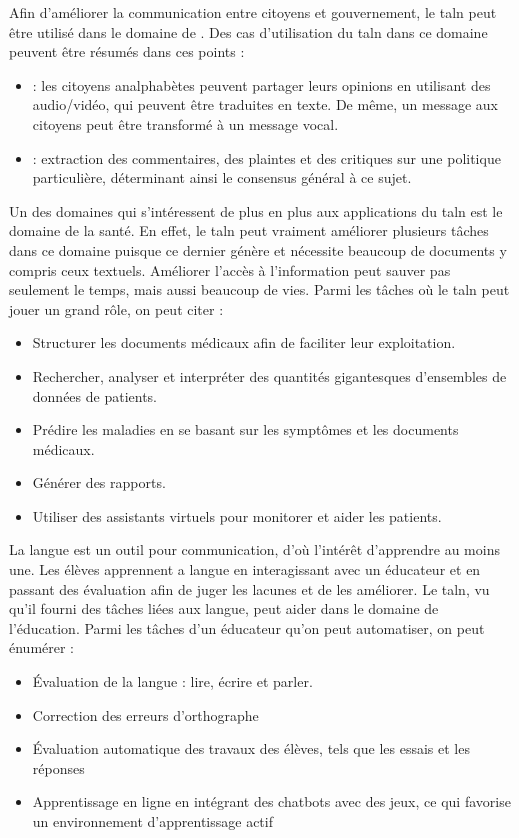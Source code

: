 \documentclass{KodeBook}
\begin{document}
Afin d'améliorer la communication entre citoyens et gouvernement, le \ac{taln} peut être utilisé dans le domaine de .
Des cas d'utilisation du \ac{taln} dans ce domaine peuvent être résumés dans ces points :
\begin{itemize}
	\item {} : les citoyens analphabètes peuvent partager leurs opinions en utilisant des audio/vidéo, qui peuvent être traduites en texte. De même, un message aux citoyens peut être transformé à un message vocal.
	\item {} : extraction des commentaires, des plaintes et des critiques sur une politique particulière, déterminant ainsi le consensus général à ce sujet.
\end{itemize}

Un des domaines qui s'intéressent de plus en plus aux applications du \ac{taln} est le domaine de la santé.
En effet, le \ac{taln} peut vraiment améliorer plusieurs tâches dans ce domaine puisque ce dernier génère et nécessite beaucoup de documents y compris ceux textuels.
Améliorer l'accès à l'information peut sauver pas seulement le temps, mais aussi beaucoup de vies.
Parmi les tâches où le \ac{taln} peut jouer un grand rôle, on peut citer :
\begin{itemize}
	\item Structurer les documents médicaux afin de faciliter leur exploitation.
	\item Rechercher, analyser et interpréter des quantités gigantesques d'ensembles de données de patients.
	\item Prédire les maladies en se basant sur les symptômes et les documents médicaux.
	\item Générer des rapports.
	\item Utiliser des assistants virtuels pour monitorer et aider les patients.
\end{itemize}

La langue est un outil pour communication, d'où l'intérêt d'apprendre au moins une. 
Les élèves apprennent a langue en interagissant avec un éducateur et en passant des évaluation afin de juger les lacunes et de les améliorer. 
Le \ac{taln}, vu qu'il fourni des tâches liées aux langue, peut aider dans le domaine de l'éducation.
Parmi les tâches d'un éducateur qu'on peut automatiser, on peut énumérer :
\begin{itemize}
	\item Évaluation de la langue : lire, écrire et parler.
	\item Correction des erreurs d'orthographe 
	\item Évaluation automatique des travaux des élèves, tels que les essais et les réponses
	\item Apprentissage en ligne en intégrant des chatbots avec des jeux, ce qui favorise un environnement d'apprentissage actif
\end{itemize}
\end{document}
